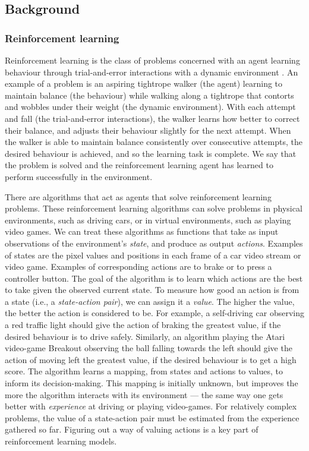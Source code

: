 \documentclass[12pt,a4paper]{article}
\begin{document}
\subsection{Background} 
\subsubsection{Reinforcement learning}
Reinforcement learning is the class of problems concerned with an agent learning behaviour through trial-and-error interactions with a dynamic environment \cite{Kaelbling1996}. An example of a problem is an aspiring tightrope walker (the agent) learning to maintain balance (the behaviour) while walking along a tightrope that contorts and wobbles under their weight (the dynamic environment). With each attempt and fall (the trial-and-error interactions), the walker learns how better to correct their balance, and adjusts their behaviour slightly for the next attempt. When the walker is able to maintain balance consistently over consecutive attempts, the desired behaviour is achieved, and so the learning task is complete. We say that the problem is solved and the reinforcement learning agent has learned to perform successfully in the environment.  

There are algorithms that act as agents that solve reinforcement learning problems. These reinforcement learning algorithms can solve problems in physical environments, such as driving cars, or in virtual environments, such as playing video games. We can treat these algorithms as functions that take as input observations of the environment's \emph{state}, and produce as output \emph{actions}. Examples of states are the pixel values and positions in each frame of a car video stream or video game. Examples of corresponding actions are to brake or to press a controller button. The goal of the algorithm is to learn which actions are the best to take given the observed current state. To measure how good an action is from a state (i.e., a \emph{state-action pair}), we can assign it a \emph{value}. The higher the value, the better the action is considered to be. For example, a self-driving car observing a red traffic light should give the action of braking the greatest value, if the desired behaviour is to drive safely. Similarly, an algorithm playing the Atari video-game Breakout observing the ball falling towards the left should give the action of moving left the greatest value, if the desired behaviour is to get a high score. The algorithm learns a mapping, from states and actions to values, to inform its decision-making. This mapping is initially unknown, but improves the more the algorithm interacts with its environment --- the same way one gets better with \emph{experience} at driving or playing video-games. For relatively complex problems, the value of a state-action pair must be estimated from the experience gathered so far. Figuring out a way of valuing actions is a key part of reinforcement learning models.
\end{document}
